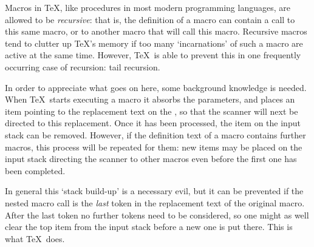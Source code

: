 \documentclass[letterpaper]{book}
\begin{document}
Macros in \TeX, like procedures in most modern programming
languages, are allowed to be \emph{recursive}: that is, the 
definition of a macro can contain a call to this same macro,
or to another macro that will call this macro.
Recursive macros tend to clutter up \TeX's memory
if too many `incarnations' of such a macro are active
at the same time. However, \TeX\ is able to prevent this
in one frequently occurring case of recursion: tail recursion.

In order to  appreciate what goes on here, some background
knowledge is needed. When \TeX\ starts executing a macro
it absorbs the parameters, and places an item pointing to
the replacement text on the ,
so that the scanner will next be directed to
this replacement. Once it has been processed, the item on the 
input stack can be removed.
However, if the definition text
of a macro contains further macros, this process will be
repeated for them: new items may be placed on the input stack
directing the scanner to other macros
even before the first one has been completed.

In general this `stack build-up' is a necessary evil, but
it can be prevented if the nested macro call is the
{\em last\/} token in the replacement text of the original
macro. After the last token no further tokens need to be
considered, so one might as well clear the top item
from the input stack
before a new one is put there.
This is what \TeX\ does.
\end{document}
